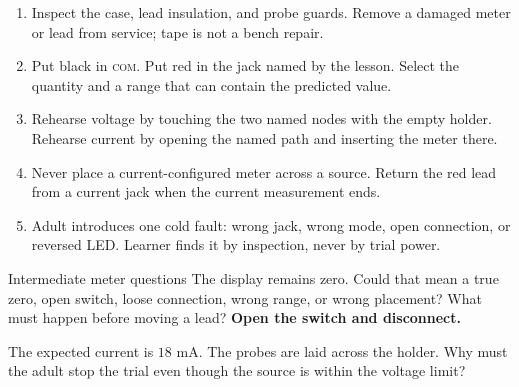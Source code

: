 \begin{center}
\end{center}

\begin{enumerate}
\item Inspect the case, lead insulation, and probe guards. Remove a damaged
meter or lead from service; tape is not a bench repair.
\item Put black in \textsc{com}. Put red in the jack named by the lesson. Select
the quantity and a range that can contain the predicted value.
\item Rehearse voltage by touching the two named nodes with the empty holder.
Rehearse current by opening the named path and inserting the meter there.
\item Never place a current-configured meter across a source. Return the red
lead from a current jack when the current measurement ends.
\item Adult introduces one cold fault: wrong jack, wrong mode, open connection,
or reversed LED. Learner finds it by inspection, never by trial power.
\end{enumerate}

\begin{teloscard}{Intermediate meter questions}
The display remains zero. Could that mean a true zero, open switch, loose
connection, wrong range, or wrong placement? What must happen before moving a
lead? \textbf{Open the switch and disconnect.}\par
The expected current is \(18\) mA. The probes are laid across the holder. Why
must the adult stop the trial even though the source is within the voltage limit?
\end{teloscard}

